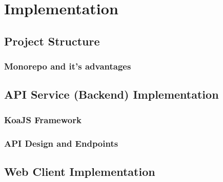 \chapter{Implementation}
\label{chap:implementation}

\section{Project Structure}
\label{sec:project-structure}

\subsection{Monorepo and it's advantages}
\label{subsec:monorepo-advantages}

\section{API Service (Backend) Implementation}
\label{sec:api-service-implementation}

\subsection{KoaJS Framework}
\label{subsec:koajs-framework}


\subsection{API Design and Endpoints}
\label{subsec:api-design-endpoints}

\section{Web Client Implementation}
\label{sec:web-client-implementation}

